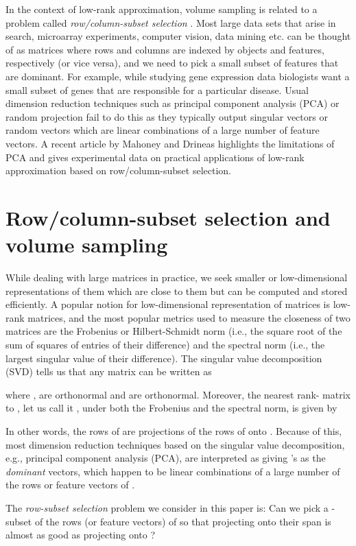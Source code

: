 \documentclass[11pt]{article}
\begin{document}
In the context of low-rank approximation, volume sampling is related to a problem called \emph{row/column-subset selection} \cite{BDM}. Most large data sets that arise in search, microarray experiments, computer vision, data mining etc. can be thought of as matrices where rows and columns are indexed by objects and features, respectively (or vice versa), and we need to pick a small subset of features that are dominant. For example, while studying gene expression data biologists want a small subset of genes that are responsible for a particular disease. Usual dimension reduction techniques such as principal component analysis (PCA) or random projection fail to do this as they typically output singular vectors or random vectors which are linear combinations of a large number of feature vectors. A recent article by Mahoney and Drineas \cite{MD} highlights the limitations of PCA and gives experimental data on practical applications of low-rank approximation based on row/column-subset selection.

\section{Row/column-subset selection and volume sampling}
While dealing with large matrices in practice, we seek smaller or low-dimensional representations of them which are close to them but can be computed and stored efficiently. A popular notion for low-dimensional representation of matrices is low-rank matrices, and the most popular metrics used to measure the closeness of two matrices are the Frobenius or Hilbert-Schmidt norm (i.e., the square root of the sum of squares of entries of their difference) and the spectral norm (i.e., the largest singular value of their difference). The singular value decomposition (SVD) tells us that any matrix  can be written as

where ,  are orthonormal and  are orthonormal. Moreover, the nearest rank- matrix to , let us call it , under both the Frobenius and the spectral norm, is given by

In other words, the rows of  are projections of the rows of  onto . Because of this, most dimension reduction techniques based on the singular value decomposition, e.g., principal component analysis (PCA), are interpreted as giving 's as the \emph{dominant} vectors, which happen to be linear combinations of a large number of the rows or feature vectors of .

The \emph{row-subset selection} problem we consider in this paper is: Can we pick a -subset of the rows (or feature vectors) of  so that projecting onto their span is almost as good as projecting onto ?
\end{document}
